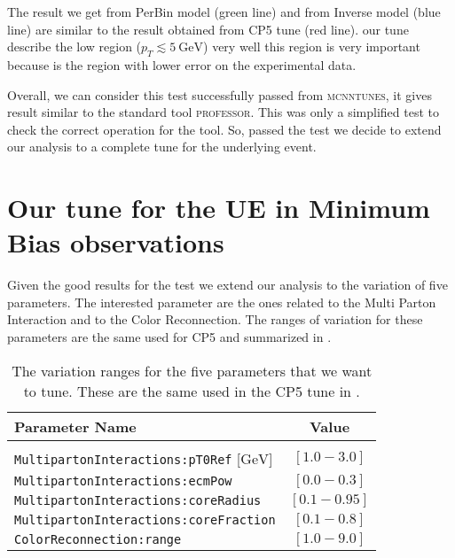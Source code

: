 \noindent The result we get from PerBin model (green line) and from Inverse model (blue line) are similar to the result obtained from CP5 tune (red line). our tune describe the low region ($p_T\lesssim 5\ \mathrm{GeV}$) very well this region is very important because is the region with lower error on the experimental data.

Overall, we can consider this test successfully passed from \textsc{mcnntunes}, it gives result similar to the standard tool \textsc{professor}. This was only a simplified test to check the correct operation for the tool. So, passed the test we decide to extend our analysis to a complete tune for the underlying event.




\section{Our tune for the UE in Minimum Bias observations}

Given the good results for the test we extend our analysis to the variation of five parameters. The interested parameter are the ones related to the Multi Parton Interaction and to the Color Reconnection. The ranges of variation for these parameters are the same used for CP5 and summarized in .

\begin{table}[!htb]
\centering
\begin{tabular}{l | c }
Parameter Name & Value \\ 
\hline \hline
\\[-0.85em]
	\texttt{MultipartonInteractions:pT0Ref} [$\mathrm{GeV}$] & $[1.0 - 3.0]$\\[2pt]
	\texttt{MultipartonInteractions:ecmPow} & $[0.0 - 0.3]$\\[2pt]
	\texttt{MultipartonInteractions:coreRadius} & $[0.1 - 0.95 ]$\\[2pt]
	\texttt{MultipartonInteractions:coreFraction} & $[ 0.1 - 0.8 ]$\\[2pt]
	\texttt{ColorReconnection:range} & $[  1.0 - 9.0 ]$
\end{tabular}
\caption{The variation ranges for the five parameters that we want to tune. These are the same used in the CP5 tune in \cite{CPtunes}.}
\label{table:ranges5params}
\end{table}

